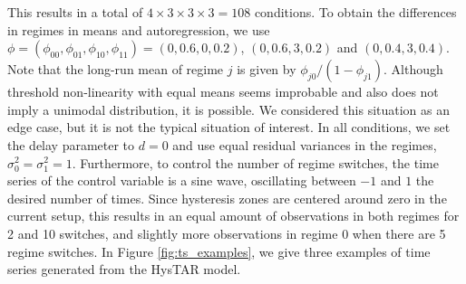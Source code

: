 \documentclass{article}
\begin{document}
This results in a total of $4 \times 3 \times 3 \times 3 = 108$ conditions.
To obtain the differences in regimes in means and autoregression, we use $\phi = (\phi_{00}, \phi_{01}, \phi_{10}, \phi_{11}) = (0, 0.6, 0, 0.2)$, $(0, 0.6, 3, 0.2)$ and $(0, 0.4, 3, 0.4)$. Note that the long-run mean of regime $j$ is given by $\phi_{j0}/(1 - \phi_{j1})$. Although threshold non-linearity with equal means seems improbable and also does not imply a unimodal distribution, it is possible. We considered this situation as an edge case, but it is not the typical situation of interest.
In all conditions, we set the delay parameter to $d = 0$ and use equal residual variances in the regimes, $\sigma_0^2 = \sigma_1^2 = 1$. 
Furthermore, to control the number of regime switches, the time series of the control variable is a sine wave, oscillating between $-1$ and $1$ the desired number of times.
Since hysteresis zones are centered around zero in the current setup, this results in an equal amount of observations in both regimes for 2 and 10 switches, and slightly more observations in regime 0 when there are 5 regime switches.
In Figure \ref{fig:ts_examples}, we give three examples of time series generated from the HysTAR model.
\end{document}
